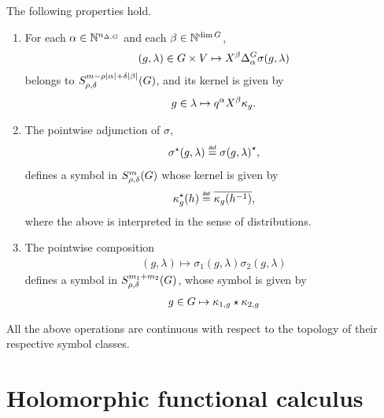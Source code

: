 \begin{proposition}
    The following properties hold.
    \begin{enumerate}
        \item For each $\alpha \in \mathbb{N}^{n_{\Delta, G}}$ and each $\beta \in \mathbb{N}^{\dim G}$,
            \begin{align*}
                (g, \lambda) \in \Group \times \VectorSpace \mapsto
                \LeftDifferentialOperator \beta \DifferenceOperator \alpha \sigma(g, \lambda)
            \end{align*}
            belongs to $S^{m - \rho \left|{\alpha}\right| + \delta \left|{\beta}\right|}_{\rho, \delta}(G)$,
            and its kernel is given by
            \begin{align*}
                g \in \lambda \mapsto q^\alpha \LeftDifferentialOperator \beta \kappa_g.
            \end{align*}
        \item The pointwise adjunction of $\sigma$,
            \begin{align*}
                \adj \sigma(g, \lambda) \defeq \adj {\sigma(g, \lambda)},
            \end{align*}
            defines a symbol in $S^{m}_{\rho, \delta}(G)$ whose kernel is given by
            \begin{align*}
                \adj \kappa_g(h) \defeq \conj {\kappa_g(h^{-1})},
            \end{align*}
            where the above is interpreted in the sense of distributions.
        \item
            \label{item:properties_of_symbols:pointwise_composition}
            The pointwise composition
            \begin{align*}
                (g, \lambda) \mapsto \sigma_1(g, \lambda) \sigma_2(g, \lambda)
            \end{align*}
            defines a symbol in $S^{m_1 + m_2}_{\rho, \delta}(G)$,
            whose symbol is given by
            \begin{align*}
                g \in G \mapsto \kappa_{1, g} \star \kappa_{2, g}
            \end{align*}
    \end{enumerate}

    All the above operations are continuous with respect to the topology of their respective symbol classes.
\end{proposition}

\section{Holomorphic functional calculus}
\label{section:functional_calculus}

